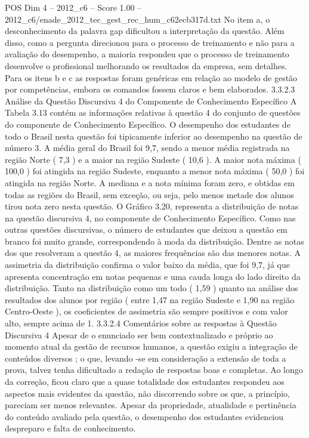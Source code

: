 \begin{textsample}{POS Dim 4 – 2012\_c6 – Score 1.00 – 2012\_c6/enade\_2012\_tec\_gest\_rec\_hum\_c62ecb317d.txt}
No item a, o desconhecimento da palavra gap dificultou a interpretação da questão.
Além disso, como a pergunta direcionou para o processo de treinamento e não para a avaliação do desempenho, a maioria respondeu que o processo de treinamento desenvolve o profissional melhorando os resultados da empresa, sem detalhes.
Para os itens b e c as respostas foram genéricas em relação ao modelo de gestão por competências, embora os comandos fossem claros e bem elaborados. 3.3.2.3 Análise da Questão Discursiva 4 do Componente de Conhecimento Específico A Tabela 3.13 contém as informações relativas à questão 4 do conjunto de questões do componente de Conhecimento Específico.
O desempenho dos estudantes de todo o Brasil nesta questão foi tipicamente inferior ao desempenho na questão de número 3.
A média geral do Brasil foi 9,7, sendo a menor média registrada na região Norte ( 7,3 ) e a maior na região Sudeste ( 10,6 ).
A maior nota máxima ( 100,0 ) foi atingida na região Sudeste, enquanto a menor nota máxima ( 50,0 ) foi atingida na região Norte.
A mediana e a nota mínima foram zero, e obtidas em todas as regiões do Brasil, sem exceção, ou seja, pelo menos metade dos alunos tirou nota zero nesta questão.
O Gráfico 3.20, representa a distribuição de notas na questão discursiva 4, no componente de Conhecimento Específico.
Como nas outras questões discursivas, o número de estudantes que deixou a questão em branco foi muito grande, correspondendo à moda da distribuição.
Dentre as notas dos que resolveram a questão 4, as maiores frequências são das menores notas.
A assimetria da distribuição confirma o valor baixo da média, que foi 9,7, já que apresenta concentração em notas pequenas e uma cauda longa do lado direito da distribuição.
Tanto na distribuição como um todo ( 1,59 ) quanto na análise dos resultados dos alunos por região ( entre 1,47 na região Sudeste e 1,90 na região Centro-Oeste ), os coeficientes de assimetria são sempre positivos e com valor alto, sempre acima de 1. 3.3.2.4 Comentários sobre as respostas à Questão Discursiva 4 Apesar de o enunciado ser bem contextualizado e próprio ao momento atual da gestão de recursos humanos, a questão exigiu a integração de conteúdos diversos ; o que, levando -se em consideração a extensão de toda a prova, talvez tenha dificultado a redação de respostas boas e completas.
Ao longo da correção, ficou claro que a quase totalidade dos estudantes respondeu aos aspectos mais evidentes da questão, não discorrendo sobre os que, a princípio, pareciam ser menos relevantes.
Apesar da propriedade, atualidade e pertinência do conteúdo avaliado pela questão, o desempenho dos estudantes evidenciou despreparo e falta de conhecimento.

\end{textsample}
